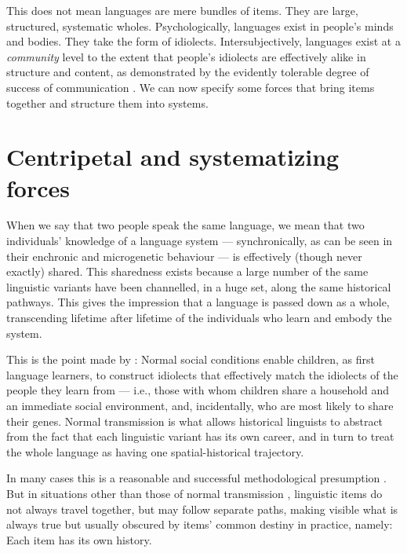 This does not mean languages are mere bundles 
of items. They are large, structured, systematic wholes. Psychologically, languages exist in people's minds and bodies.
They take the form of idiolects. Intersubjectively, 
languages exist at a \textit{community} level to the extent that people's 
idiolects are effectively alike in structure and content, as 
demonstrated by the evidently tolerable degree of success 
of communication \citep{enfield_utility_2015}. We can now 
specify some forces that bring items together and structure them into 
systems.



\section{Centripetal and systematizing forces}

When we say that two people speak the same language, we mean that two individuals' knowledge of a language system --- synchronically, as can be seen in their enchronic and microgenetic behaviour --- is effectively (though never exactly) shared. This sharedness exists because a large number of the same linguistic variants have been channelled, in a huge set, along the same historical pathways. This gives the impression that a language is passed down as a whole, transcending lifetime after lifetime of the individuals who learn and embody the system. 



This is the point made by \citet{thomason_language_1988}: Normal social 
conditions enable children, as first language learners, to construct 
idiolects that effectively match the idiolects of the people they learn 
from --- i.e., those with whom children share a household and an immediate social 
environment, and, incidentally, who are most likely to share their 
genes. Normal transmission is what allows historical linguists to 
abstract from the fact that each linguistic variant has its own career, 
and in turn to treat the whole language as having one 
spatial-historical trajectory.



In many cases this is a reasonable and successful methodological 
presumption \citep{haspelmath_how_2004}. But in 
situations other than those of normal transmission \citep{le_page_acts_1985,thomason_language_1988}, linguistic items do 
not always travel together, but may follow separate paths, making 
visible what is always true but usually obscured by items' common 
destiny in practice, namely: Each item has its own history. 



